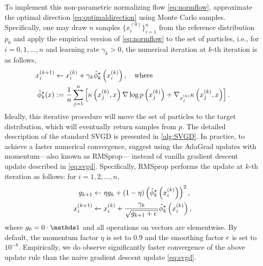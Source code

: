 To implement this non-parametric normalizing flow \cref{eq:normflow}, \citet{liu2016stein} approximate the optimal direction \cref{eq:optimaldirection} using Monte Carlo samples.
Specifically, one may draw $n$ samples $\{x_i^{(0)}  \}_{i = 1}^n$  from the reference distribution $p_0$ and apply the empirical version of \cref{eq:normflow} to the set of particles, i.e., for $i = 0, 1,\dots, n$ and learning rate $\gamma_k >0$,  the numerical iteration at $k$-th iteration is as follows,
\[
   \begin{aligned}
    x_{i}^{(k+1)} & \leftarrow x_{i}^{(k)}+ \gamma_k \hat{\phi}_k^{\star}\left(x_{i}^{(k)}\right),\quad \text {where } \\
    \hat{\phi}_k^{\star}(x) & := \frac{1}{n} \sum_{j=1}^{n}\left[\kappa\left(x_{j}^{(k)}, x\right) \nabla \log p\left(x_{j}^{(k)}\right)+\nabla_{x_{j}^{(k)}} \kappa\left(x_{j}^{(k)}, x\right)\right].
   \end{aligned}
   \label{eq:svgd}
\]
Ideally, this iterative procedure will move the set of particles to the target distribution, which will eventually return samples from $p$.  The detailed description of the standard SVGD is presented in \cref{alg:SVGD}.
In practice, to achieve a faster numerical convergence, \citet{liu2016stein} suggest using the AdaGrad updates with momentum---also known as RMSprop--- instead of vanilla gradient descent update described in \cref{eq:svgd}.  
Specifically, RMSprop performs the update at $k$-th iteration as follows: for $i = 1, 2, \dots, n$,
\[\label{eq:rms}
    \begin{aligned}
        g_{k+1} &\gets \eta g_k + (1 - \eta) \left(\hat{\phi}_k^{\star}\left(x_{i}^{(k)}\right)\right)^2,\\
        x_{i}^{(k+1)} &\gets x_i^{(k)} + \frac{\gamma_k}{\sqrt{g_{k+1}+\eps} } \hat{\phi}_k^{\star}\left(x_{i}^{(k)}\right),  
    \end{aligned}  
\]
where $g_0 = 0\cdot\ind$ and all operations on vectors are elementwise. By default, the momentum factor $\eta$ is set to $0.9$ and the smoothing factor $\epsilon$ is set to $10^{-8}$. Empirically, we do observe significantly faster convergence of the above update rule than the naive gradient descent update \cref{eq:svgd}. 




